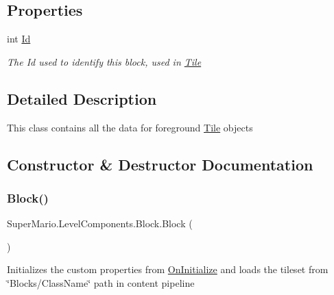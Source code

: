 \subsection*{Properties}
\begin{DoxyCompactItemize}
\item 
int \mbox{\hyperlink{class_super_mario_1_1_level_components_1_1_block_ac3af8077575bf6621dc81d8566857af5}{Id}}
\begin{DoxyCompactList}\small\item\em The Id used to identify this block, used in \mbox{\hyperlink{class_super_mario_1_1_tile}{Tile}} \end{DoxyCompactList}\end{DoxyCompactItemize}


\subsection{Detailed Description}
This class contains all the data for foreground \mbox{\hyperlink{class_super_mario_1_1_tile}{Tile}} objects 



\subsection{Constructor \& Destructor Documentation}
\mbox{\label{class_super_mario_1_1_level_components_1_1_block_a0a4ef8a1af9e91bd1e5774c90e74e65d}} 
\subsubsection{\texorpdfstring{Block()}{Block()}}
{\footnotesize\ttfamily Super\+Mario.\+Level\+Components.\+Block.\+Block (\begin{DoxyParamCaption}{ }\end{DoxyParamCaption})\hspace{0.3cm}{\ttfamily [protected]}}



Initializes the custom properties from \mbox{\hyperlink{class_super_mario_1_1_level_components_1_1_block_aecd2a6fa80ecbd7dd5cec2cdf4b149ec}{On\+Initialize}} and loads the tileset from \char`\"{}\+Blocks/\+Class\+Name\char`\"{} path in content pipeline 



